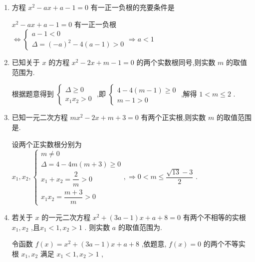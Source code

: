 \begin{enumerate}
\begin{jieda}
        $\dfrac{1}{1 + {a}^{2}} + \dfrac{1}{1 + {b}^{2}} = \dfrac{2 + {a}^{2} + {b}^{2}}{\left( {1 + {a}^{2}}\right) \left( {1 + {b}^{2}}\right) } = \dfrac{2 + {a}^{2} + {b}^{2}}{1 + {a}^{2} + {b}^{2} + {a}^{2}{b}^{2}} = \dfrac{2 + {14}}{1 + {14} + 1} = 1$
    \end{jieda}

    
    \item 方程 ${x}^{2} - {ax} + a - 1 = 0$ 有一正一负根的充要条件是
    \begin{jieda}
        ${x}^{2} - {ax} + a - 1 = 0$ 有一正一负根 $\Leftrightarrow  \left\{  {\begin{array}{l} a - 1 < 0 \\  \Delta  = {\left( -a\right) }^{2} - 4\left( {a - 1}\right)  > 0 \end{array} \Longrightarrow  a < 1}\right.$
    \end{jieda}
    \item 已知关于 $x$ 的方程 ${x}^{2} - {2x} + m - 1 = 0$ 的两个实数根同号,则实数 $m$ 的取值范围为.
    \begin{jieda}
        根据题意得到 $\left\{  \begin{array}{l} \Delta  \geq  0 \\  {x}_{1}{x}_{2} > 0 \end{array}\right.$ ,即 $\left\{  \begin{array}{l} 4 - 4\left( {m - 1}\right)  \geq  0 \\  m - 1 > 0 \end{array}\right.$ ,解得 $1 < m \leq  2$ .
    \end{jieda}
    
    \item 已知一元二次方程 $m{x}^{2} - {2x} + m + 3 = 0$ 有两个正实根,则实数 $m$ 的取值范围是. 
    \begin{jieda}
        设两个正实数根分别为 ${x}_{1},{x}_{2},\left\{  {\begin{array}{l} m \neq  0 \\  \Delta  = 4 - {4m}\left( {m + 3}\right)  \geq  0 \\  {x}_{1} + {x}_{2} = \dfrac{2}{m} > 0 \\  {x}_{1}{x}_{2} = \dfrac{m + 3}{m} > 0 \end{array}, \Longrightarrow  0 < m \leq  \dfrac{\sqrt{13} - 3}{2}}\right.$ .
    \end{jieda}

    \item 若关于 $x$ 的一元二次方程 ${x}^{2} + \left( {{3a} - 1}\right) x + a + 8 = 0$ 有两个不相等的实根 ${x}_{1},{x}_{2}$ ,且${x}_{1} < 1,{x}_{2} > 1$ . 则实数 $a$ 的取值范围为.
    \begin{jieda}
        令函数 $f\left( x\right)  = {x}^{2} + \left( {{3a} - 1}\right) x + a + 8$ ,依题意, $f\left( x\right)  = 0$ 的两个不等实根 ${x}_{1},{x}_{2}$ 满足 ${x}_{1} < 1,{x}_{2} > 1$ ,
        

\end{jieda}
\end{enumerate}
